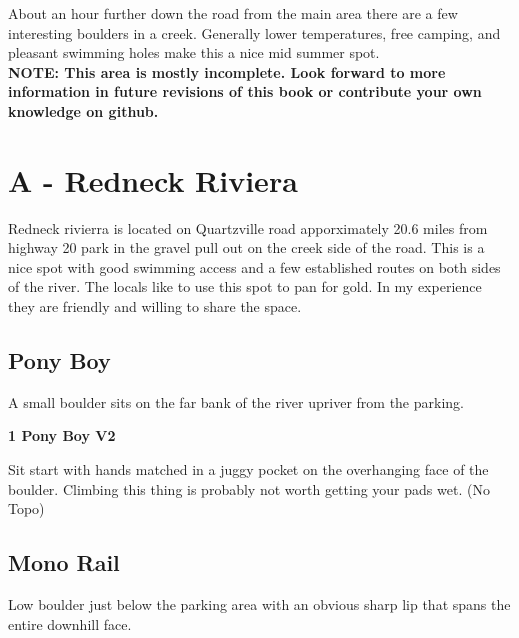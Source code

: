 \raggedcolumns
\begin{multicols}{2}
About an hour further down the road from the main area there are a few interesting boulders in a creek. Generally lower temperatures, free camping, and pleasant swimming holes make this a nice mid summer spot.\\

\textbf{NOTE: This area is mostly incomplete. Look forward to more information in future revisions of this book or contribute your own knowledge on github.}\\

\newpage

		\section{A - Redneck Riviera}\label{sa:Redneck Riviera}
	Redneck rivierra is located on Quartzville road apporximately 20.6 miles from highway 20 park in the gravel pull out on the creek side of the road. This is a nice spot with good swimming access and a few established routes on both sides of the river. The locals like to use this spot to pan for gold. In my experience they are friendly and willing to share the space.\\

	
			\subsection*{Pony Boy}\label{bf:Pony Boy}
			A small boulder sits on the far bank of the river upriver from the parking.\\
			
					\label{rt:Pony Boy}
\colorbox{green!20}{
\parbox{0.95\linewidth}{
\textbf{
1 Pony Boy V2  
}
}
}

					\begin{adjustwidth}{0.5cm}{}				
					Sit start with hands matched in a juggy pocket on the overhanging face of the boulder. Climbing this thing is probably not worth getting your pads wet.
						\newline (No Topo) 
					\end{adjustwidth}
			\subsection*{Mono Rail}\label{bf:Mono Rail}
			Low boulder just below the parking area with an obvious sharp lip that spans the entire downhill face.\\
			

\end{multicols}
